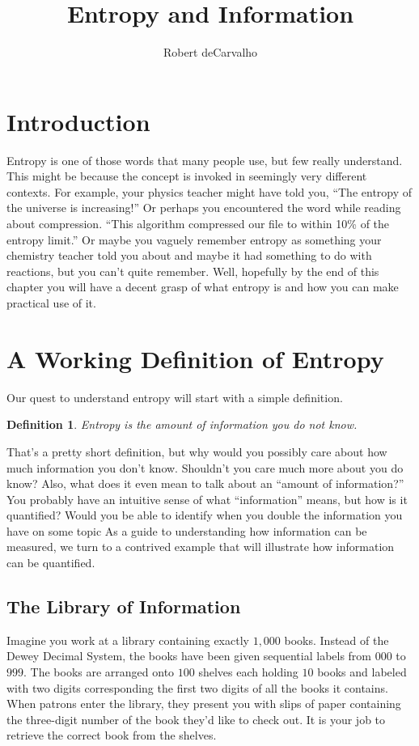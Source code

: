 \documentclass[11pt, oneside]{article}   	%
\title{Entropy and Information}
\author{Robert deCarvalho}
\date{}							%
\newtheorem{definition}{Definition}
\begin{document}
\maketitle


\section{Introduction}
Entropy is one of those words that many people use, but few really understand.
This might be because the concept is invoked in seemingly very different
contexts.  For example, your physics teacher might have told you, ``The entropy
of the universe is increasing!'' Or perhaps you encountered the word while
reading about compression. ``This algorithm compressed our file to within
10\% of the entropy limit.''  Or maybe you vaguely remember entropy as something
your chemistry teacher told you about and maybe it had something to do with
reactions, but you can't quite remember.  Well, hopefully by the end of this
chapter you will have a decent grasp of what entropy is and how you can make
practical use of it.


\section{A Working Definition of Entropy}
Our quest to understand entropy will start with a simple definition.
\begin{definition}
    Entropy is the amount of information you do not know.
\end{definition}
That's a pretty short definition, but why would you possibly care about how much
information you don't know.  Shouldn't you care much more about you do know?
Also, what does it even mean to talk about an ``amount of information?'' You
probably have an intuitive sense of what ``information'' means, but how is it
quantified?  Would you be able to identify when you double the information you
have on some topic As a guide to understanding how information can be measured,
we turn to a contrived example that will illustrate how information can be
quantified.


\subsection{The Library of Information}
Imagine you work at a library containing exactly $1,000$ books.  Instead of the
Dewey Decimal System, the books have been given sequential labels from $000$ to
$999$.  The books are arranged onto $100$ shelves each holding $10$ books and
labeled with two digits corresponding the first two digits of all the books
it contains.  When patrons enter the library, they present you with slips of
paper containing the three-digit number of the book they'd like to check out.
It is your job to retrieve the correct book from the shelves.
\end{document}
